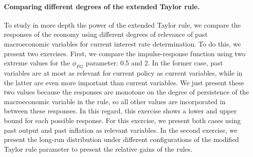 \documentclass[11pt]{article}
\numberwithin{equation}{section}
\begin{document}
\paragraph{Comparing different degrees of the extended Taylor rule.} To study in more depth the power of the extended Taylor rule, we compare the responses of the economy using different degrees of relevance of past macroeconomic variables for current interest rate determination. To do this, we present two exercises. First, we compare the impulse-response function using two extreme values for the $\phi_{FG}$ parameter: 0.5 and 2. In the former case, past variables are at most as relevant for current policy as current variables, while in the latter are even more important than current variables. We just present these two values because the responses are monotone on the degree of persistence of the macroeconomic variable in the rule, so all other values are incorporated in between these responses. In this regard, this exercise shows a lower and upper bound for each possible response. For this exercise, we present both cases using past output and past inflation as relevant variables. In the second exercise, we present the long-run distribution under different configurations of the modified Taylor rule parameter to present the relative gains of the rules.
\end{document}
